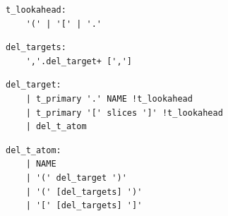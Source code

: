\noindent\textbf{\texttt{}}\par
\begin{lstlisting}
t_lookahead:
    '(' | '[' | '.'
\end{lstlisting}

\noindent\textbf{\texttt{}}\par
\begin{lstlisting}
del_targets:
    ','.del_target+ [',']
\end{lstlisting}

\noindent\textbf{\texttt{}}\par
\begin{lstlisting}
del_target:
    | t_primary '.' NAME !t_lookahead
    | t_primary '[' slices ']' !t_lookahead
    | del_t_atom
\end{lstlisting}

\noindent\textbf{\texttt{}}\par
\begin{lstlisting}
del_t_atom:
    | NAME
    | '(' del_target ')'
    | '(' [del_targets] ')'
    | '[' [del_targets] ']'
\end{lstlisting}

